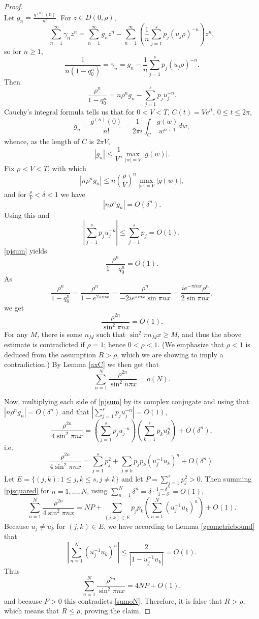 \documentclass{amsart}
\begin{document}
\begin{proof}
\[\]
Let $g_n = \frac{g^{(n)}(0)}{n!}$. 
For $z \in D(0,\rho)$,
\[
\sum_{n=1}^\infty \gamma_n z^n = \sum_{n=1}^\infty g_n z^n - \sum_{n=1}^\infty  \left(  \frac{1}{n} \sum_{j=1}^s p_j (u_j \rho)^{-n} \right) z^n,
\]
so for $n \geq 1$,
\[
 \frac{1}{n(1-q_0^n)} = \gamma_n = g_n -  \frac{1}{n} \sum_{j=1}^s p_j (u_j \rho)^{-n}.
\]
Then
\begin{equation}
\frac{\rho^n}{1-q_0^n} = n \rho^n g_n - \sum_{j=1}^s p_j u_j^{-n}.
\label{pjsum}
\end{equation}
Cauchy's integral formula \cite[p.~82, Theorem 2.41]{titchmarsh} tells us that for $0<V<T$, $C(t) = V e^{it}$, $0 \leq t \leq 2\pi$,
\[
g_n =  \frac{g^{(n)}(0)}{n!} = \frac{1}{2\pi i} \int_C \frac{g(w)}{w^{n+1}} dw,
\]
whence, as the length of $C$ is $2\pi V$,
\[
|g_n| \leq \frac{1}{V^n} \max_{|w|=V} |g(w)|.
\]
Fix $\rho<V<T$, with which
\[
|n \rho^n g_n| \leq n \left(\frac{\rho}{V}\right)^n \max_{|w|=V} |g(w)|,
\] 
and for $\frac{\rho}{V} < \delta < 1$ we have
\[
|n\rho^n g_n| = O(\delta^{n}).
\] 
Using this and
\[
\left| \sum_{j=1}^s p_j u_j^{-n} \right| \leq \sum_{j=1}^s p_j = O(1),
\]
 \eqref{pjsum} yields
 \[
 \frac{\rho^n}{1-q_0^n} = O(1).
 \] 
As 
\[
\frac{\rho^n}{1-q_0^n} = \frac{\rho^n}{1-e^{2\pi inx}}
=\frac{\rho^n}{-2i e^{\pi inx} \sin \pi nx}
=\frac{i e^{-\pi inx} \rho^n}{2 \sin \pi nx},
\]
we get 
\[
\frac{\rho^{2n}}{\sin^2 \pi nx} = O(1).
\]
For any $M$, there is some $n_M$ such that $\sin^2 \pi n_M x \geq M$, and thus the above estimate is contradicted
if $\rho=1$; hence $0<\rho<1$. (We emphasize that $\rho<1$ is deduced from the assumption 
$R>\rho$, which we are showing to imply a contradiction.) 
By Lemma \ref{axC} we then get that 
\begin{equation}
\sum_{n=1}^N \frac{\rho^{2n}}{\sin^2 n\pi x} = o(N).
\label{sumoN}
\end{equation} 

Now, multiplying each side of  \eqref{pjsum} by its complex conjugate and using
that $|n\rho^n g_n| = O(\delta^n)$ and that
$\left|\sum_{j=1}^s p_j u_j^{-n} \right| = O(1)$,
\[
\frac{\rho^{2n}}{4\sin^2 \pi nx} = \left( \sum_{j=1}^s p_j u_j^{-n} \right)\left( \sum_{k=1}^s p_k u_k^{n} \right)
+O(\delta^n),
\]
i.e.
\begin{equation}
\frac{\rho^{2n}}{4\sin^2 \pi nx} = \sum_{j=1}^s p_j^2 + \sum_{j \neq k} p_j p_k (u_j^{-1} u_k)^n + O(\delta^n).
\label{pjsquared}
\end{equation}
Let $E=\{(j,k): 1 \leq j,k \leq s, j \neq k\}$ and let
$P=\sum_{j=1}^s p_j^2 > 0$.
Then summing \eqref{pjsquared} for $n=1,\ldots,N$,
using $\sum_{n=1}^N \delta^n = \delta\cdot \frac{1-\delta^N}{1-\delta} = O(1)$, 
\[
\sum_{n=1}^N \frac{\rho^{2n}}{4\sin^2 \pi nx} = NP + \sum_{(j,k) \in E} p_j p_k \left( \sum_{n=1}^N (u_j^{-1} u_k)^n \right) + O(1).
\]
Because $u_j \neq u_k$ for $(j,k) \in E$, we have according to Lemma \ref{geometricbound} that
\[
\left| \sum_{n=1}^N (u_j^{-1} u_k)^n \right| \leq \frac{2}{|1-u_j^{-1} u_k|} =O(1).
\]
Thus
\[
\sum_{n=1}^N \frac{\rho^{2n}}{\sin^2 \pi nx} = 4NP + O(1),
\]
and because $P>0$ this contradicts \eqref{sumoN}. Therefore, it is false that $R>\rho$, which means that
 $R \leq \rho$, proving the claim.
\end{proof}
\end{document}
